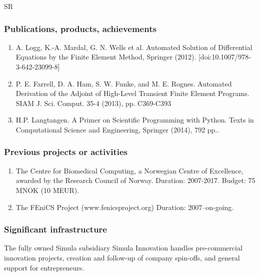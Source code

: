 \begin{sitedescription}{SR}
\subsubsection*{Publications, products, achievements}

\begin{enumerate}
\item  A. Logg, K.-A. Mardal, G. N. Wells et al. Automated Solution of Differential Equations by the Finite Element Method, Springer (2012). [doi:10.1007/978-3-642-23099-8]
\item P. E. Farrell, D. A. Ham, S. W. Funke, and M. E. Rognes.	Automated Derivation of the Adjoint of High-Level Transient Finite Element Programs. SIAM J. Sci. Comput. 35-4 (2013), pp. C369-C393
\item H.P. Langtangen. A Primer on Scientific Programming with Python. Texts in Computational Science and Engineering, Springer (2014), 792 pp..
\end{enumerate}

\subsubsection*{Previous projects or activities}

\begin{enumerate}
\item The Centre for Biomedical Computing, a Norwegian Centre of Excellence, awarded by the Research Council of Norway. Duration: 2007-2017. Budget: 75 MNOK (10 MEUR). 
\item The FEniCS Project (www.fenicsproject.org) Duration: 2007--on-going. 
\end{enumerate}

\subsubsection*{Significant infrastructure}

The fully owned Simula subsidiary Simula Innovation handles pre-commercial innovation projects, creation and follow-up of company spin-offs, and general support for entrepreneurs.
\end{sitedescription}
